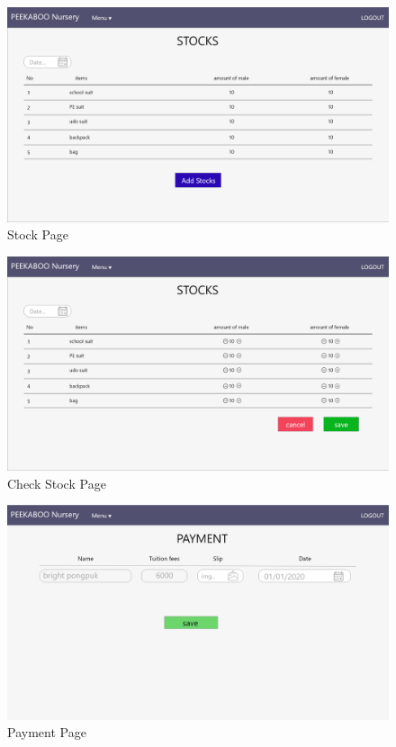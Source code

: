 \begin{figure}
  \begin{center}
  \includegraphics[width=\linewidth]{images/stockPage.png}
  \end{center}
  \caption[Poem]{Stock Page}
  \label{fig:Stock}
  \end{figure}

\begin{figure}
  \begin{center}
  \includegraphics[width=\linewidth]{images/stockPageChecking.png}
  \end{center}
  \caption[Poem]{Check Stock Page}
  \label{fig:CheckStock}
  \end{figure}

\begin{figure}
  \begin{center}
  \includegraphics[width=\linewidth]{images/paymentPage.png}
  \end{center}
  \caption[Poem]{Payment Page}
  \label{fig:Payment}
  \end{figure}



